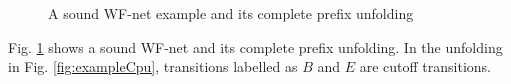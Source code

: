 \documentclass{llncs}
\begin{document}
\begin{figure}[htb]
\centering
{}
\caption{A sound WF-net example and its complete prefix unfolding}
\label{fig:examplePetriAndCpu}
\end{figure}

\begin{example}\label{ex:petriAndCpu}
Fig. \ref{fig:examplePetriAndCpu} shows a sound WF-net and its complete prefix unfolding. In the unfolding in Fig. \ref{fig:exampleCpu}, transitions labelled as $B$ and $E$ are cutoff transitions.
\end{example}
\end{document}
